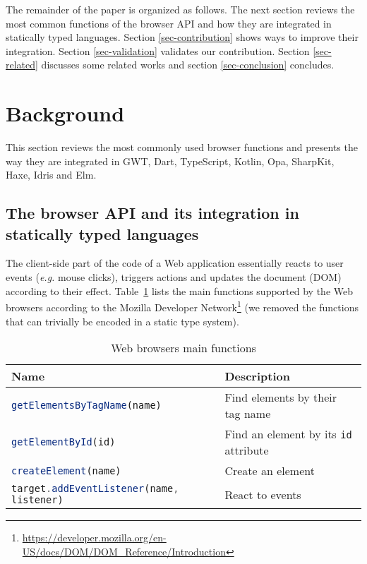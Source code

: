 \documentclass{llncs}
\newcommand{\jscode}[1]{\lstinline[language=JavaScript]|#1|}
\begin{document}
The remainder of the paper is organized as follows. The next section reviews the most common functions of the browser API and how they are integrated in statically typed languages. Section \ref{sec-contribution} shows ways to improve their integration. Section \ref{sec-validation} validates our contribution. Section \ref{sec-related} discusses some related works and section \ref{sec-conclusion} concludes.

\section{Background}
\label{sec-background}

This section reviews the most commonly used browser functions and presents the way they are integrated in GWT, Dart, TypeScript, Kotlin, Opa, SharpKit, Haxe, Idris and Elm.

\subsection{The browser API and its integration in statically typed languages}

The client-side part of the code of a Web application essentially reacts to user events (\emph{e.g.} mouse clicks), triggers actions and updates the document (DOM) according to their effect. Table~\ref{table-dom-api} lists the main functions supported by the Web browsers according to the Mozilla Developer Network\footnote{\href{https://developer.mozilla.org/en-US/docs/DOM/DOM\_Reference/Introduction}{https://developer.mozilla.org/en-US/docs/DOM/DOM\_Reference/Introduction}} (we removed the functions that can trivially be encoded in a static type system).

\begin{table}
 \centering
 \begin{tabular}{ll}
  \hline
  Name & Description \\
  \hline
  \jscode{getElementsByTagName(name)} & Find elements by their tag name \\
  \jscode{getElementById(id)} & Find an element by its \jscode{id} attribute \\
  \jscode{createElement(name)} & Create an element \\
  \jscode{target.addEventListener(name, listener)} & React to events \\
  \hline
 \end{tabular}

 \label{table-dom-api}
 \caption{Web browsers main functions}
\end{table}
\end{document}
